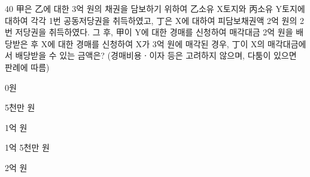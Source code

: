 \begin{question}{40}
甲은 乙에 대한 3억 원의 채권을 담보하기 위하여 乙소유 X토지와 丙소유 Y토지에 대하여 각각 1번 공동저당권을 취득하였고, 丁은 X에 대하여 피담보채권액 2억 원의 2번 저당권을 취득하였다. 그 후, 甲이 Y에 대한 경매를 신청하여 매각대금 2억 원을 배당받은 후 X에 대한 경매를 신청하여 X가 3억 원에 매각된 경우, 丁이 X의 매각대금에서 배당받을 수 있는 금액은? (경매비용ㆍ이자 등은 고려하지 않으며, 다툼이 있으면 판례에 따름)
\begin{choices}
  \item 0원
  \item 5천만 원
  \item 1억 원
  \item 1억 5천만 원
  \item 2억 원
\end{choices}
\end{question}
